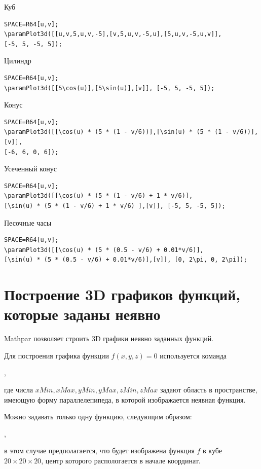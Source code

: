 Куб

\begin{verbatim}
SPACE=R64[u,v];
\paramPlot3d([[u,v,5,u,v,-5],[v,5,u,v,-5,u],[5,u,v,-5,u,v]], 
[-5, 5, -5, 5]);
\end{verbatim}

Цилиндр

\begin{verbatim}
SPACE=R64[u,v];
\paramPlot3d([[5\cos(u)],[5\sin(u)],[v]], [-5, 5, -5, 5]);
\end{verbatim}

Конус

\begin{verbatim}
SPACE=R64[u,v];
\paramPlot3d([[\cos(u) * (5 * (1 - v/6))],[\sin(u) * (5 * (1 - v/6))],[v]], 
[-6, 6, 0, 6]);
\end{verbatim}

Усеченный конус

\begin{verbatim}
SPACE=R64[u,v];
\paramPlot3d([[\cos(u) * (5 * (1 - v/6) + 1 * v/6)],
[\sin(u) * (5 * (1 - v/6) + 1 * v/6) ],[v]], [-5, 5, -5, 5]);
\end{verbatim}

Песочные часы

\begin{verbatim}
SPACE=R64[u,v];
\paramPlot3d([[\cos(u) * (5 * (0.5 - v/6) + 0.01*v/6)],
[\sin(u) * (5 * (0.5 - v/6) + 0.01*v/6)],[v]], [0, 2\pi, 0, 2\pi]);
\end{verbatim}



\section{Построение 3D графиков  функций, которые заданы неявно}
 Mathpar позволяет строить 3D графики неявно заданных функций. 
 
 Для построения  графика функции $f(x,y,z)=0$ используется команда 
 
, 

где числа $xMin, xMax, yMin, yMax, zMin, zMax$ задают область в пространстве, имеющую форму параллелепипеда,
в которой изображается неявная функция. 

Можно задавать только одну функцию, следующим образом:

,

в этом случае предполагается, что будет изображена функция $f$ в кубе $20\times20\times20$, 
центр которого распологается в начале координат.

